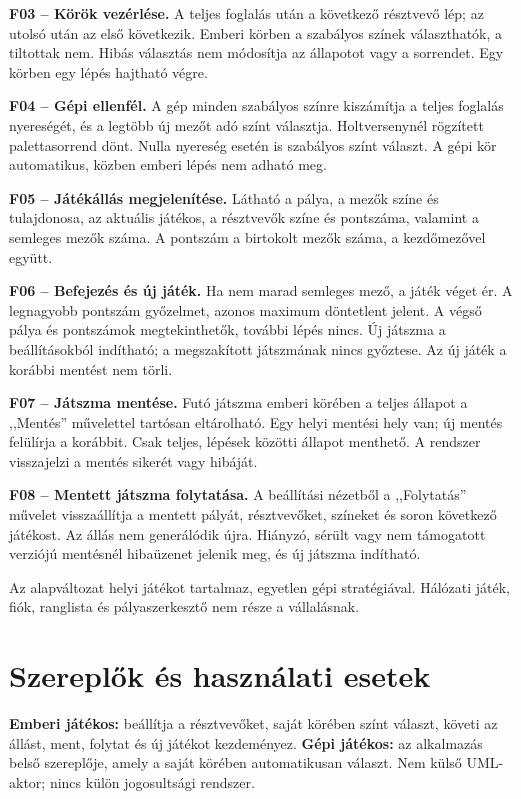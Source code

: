 \documentclass[11pt,a4paper]{article}
\begin{document}
\textbf{F03 -- Körök vezérlése.}
A teljes foglalás után a következő résztvevő lép; az utolsó után az első
következik. Emberi körben a szabályos színek választhatók, a tiltottak
nem. Hibás választás nem módosítja az állapotot vagy a sorrendet.
Egy körben egy lépés hajtható végre.

\textbf{F04 -- Gépi ellenfél.}
A gép minden szabályos színre kiszámítja a teljes foglalás nyereségét,
és a legtöbb új mezőt adó színt választja. Holtversenynél rögzített
palettasorrend dönt. Nulla nyereség esetén is szabályos színt választ.
A gépi kör automatikus, közben emberi lépés nem adható meg.

\textbf{F05 -- Játékállás megjelenítése.}
Látható a pálya, a mezők színe és tulajdonosa, az aktuális játékos,
a résztvevők színe és pontszáma, valamint a semleges mezők száma.
A pontszám a birtokolt mezők száma, a kezdőmezővel együtt.

\textbf{F06 -- Befejezés és új játék.}
Ha nem marad semleges mező, a játék véget ér. A legnagyobb pontszám
győzelmet, azonos maximum döntetlent jelent. A végső pálya és pontszámok
megtekinthetők, további lépés nincs. Új játszma a beállításokból indítható;
a megszakított játszmának nincs győztese. Az új játék a korábbi mentést nem törli.

\textbf{F07 -- Játszma mentése.}
Futó játszma emberi körében a teljes állapot a ,,Mentés'' művelettel
tartósan eltárolható. Egy helyi mentési hely van; új mentés felülírja
a korábbit. Csak teljes, lépések közötti állapot menthető.
A rendszer visszajelzi a mentés sikerét vagy hibáját.

\textbf{F08 -- Mentett játszma folytatása.}
A beállítási nézetből a ,,Folytatás'' művelet visszaállítja a mentett
pályát, résztvevőket, színeket és soron következő játékost.
Az állás nem generálódik újra. Hiányzó, sérült vagy nem támogatott
verziójú mentésnél hibaüzenet jelenik meg, és új játszma indítható.

Az alapváltozat helyi játékot tartalmaz, egyetlen gépi stratégiával.
Hálózati játék, fiók, ranglista és pályaszerkesztő nem része
a vállalásnak.

\section{Szereplők és használati esetek}
\textbf{Emberi játékos:} beállítja a résztvevőket, saját körében színt
választ, követi az állást, ment, folytat és új játékot kezdeményez.
\textbf{Gépi játékos:} az alkalmazás belső szereplője, amely a saját körében
automatikusan választ. Nem külső UML-aktor; nincs külön jogosultsági rendszer.
\end{document}
